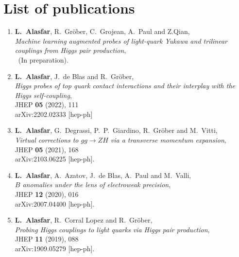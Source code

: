 
\chapter*{List of publications}
\begin{enumerate}
		\item \textbf{L.~Alasfar},  R.~Gr\"ober, C.~Grojean, A.~Paul and Z.Qian,\\
	\textit{Machine learning augmented probes of light-quark Yukawa and trilinear couplings from Higgs pair production}, \\
	~(In preparation).
	\item \textbf{L.~Alasfar}, J.~de Blas and R.~Gr\"ober,\\
	\textit{Higgs probes of top quark contact interactions and their interplay with the Higgs self-coupling}, \\
	JHEP \textbf{05} (2022), 111\\ 
	arXiv:2202.02333 [hep-ph]
 \item \textbf{L.~Alasfar}, G.~Degrassi, P.~P.~Giardino, R.~Gr\"ober and M.~Vitti,\\
 \textit{Virtual corrections to $gg\to ZH$ via a transverse momentum expansion},\\
 JHEP \textbf{05} (2021), 168\\ arXiv:2103.06225 [hep-ph].
\item \textbf{L.~Alasfar}, A.~Azatov, J.~de Blas, A.~Paul and M.~Valli,\\
\textit{$B$ anomalies under the lens of electroweak precision},\\
JHEP \textbf{12} (2020), 016\\
arXiv:2007.04400 [hep-ph].
\item \textbf{L.~Alasfar}, R.~Corral Lopez and R.~Gr\"ober,\\
\textit{Probing Higgs couplings to light quarks via Higgs pair production},\\
JHEP \textbf{11} (2019), 088\\
arXiv:1909.05279 [hep-ph].
\end{enumerate}%

%
